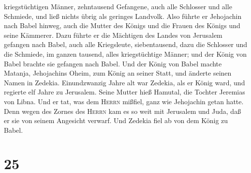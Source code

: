 kriegstüchtigen Männer, zehntausend Gefangene, auch alle Schlosser und
alle Schmiede, und ließ nichts übrig als geringes Landvolk.
 Also führte er Jehojachin nach Babel hinweg, auch die
Mutter des Königs und die Frauen des Königs und seine Kämmerer. Dazu
führte er die Mächtigen des Landes von Jerusalem gefangen nach Babel,
 auch alle Kriegsleute, siebentausend, dazu die Schlosser
und die Schmiede, im ganzen tausend, alles kriegstüchtige Männer; und
der König von Babel brachte sie gefangen nach Babel.  Und
der König von Babel machte Matanja, Jehojachins Oheim, zum König an
seiner Statt, und änderte seinen Namen in Zedekia. 
Einundzwanzig Jahre alt war Zedekia, als er König ward, und regierte elf
Jahre zu Jerusalem. Seine Mutter hieß Hamutal, die Tochter Jeremias von
Libna.  Und er tat, was dem \textsc{Herrn} mißfiel, ganz
wie Jehojachin getan hatte.  Denn wegen des Zornes des
\textsc{Herrn} kam es so weit mit Jerusalem und Juda, daß er sie von
seinem Angesicht verwarf. Und Zedekia fiel ab von dem König zu Babel.

\hypertarget{section-24}{%
\section{25}\label{section-24}}

